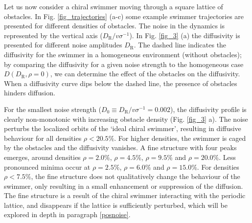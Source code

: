 \documentclass[aps,pre,twocolumn,showpacs,superscriptaddress,amsmath,amssymb,longbibliography]{revtex4-2}
\begin{document}
Let us now consider a chiral swimmer moving through a square lattice of obstacles. In Fig. \ref{fig_trajectories} (a-c) some example swimmer trajectories are presented for different densities of obstacles. The noise in the dynamics is represented by the vertical axis ($D_{\textrm{R}}/v\sigma^{-1}$). In Fig. \ref{fig_3} (a) the diffusivity is presented for different noise amplitudes $D_{\textrm{R}}$. The dashed line indicates the diffusivity for the swimmer in a homogeneous environment (without obstacles); by comparing the diffusivity for a given noise strength to the homogeneous case $D(D_{\textrm{R}},\rho=0)$, we can determine the effect of the obstacles on the diffusivity.  When a diffusivity curve dips below the dashed line, the presence of obstacles hinders diffusion.

For the smallest noise strength ($D_{\textrm{0}} \equiv D_{\textrm{R}}/v\sigma^{-1} =0.002$), the diffusivity profile is clearly non-monotonic with increasing obstacle density (Fig. \ref{fig_3} a). The noise perturbs the localized orbits of the `ideal chiral swimmer', resulting in diffusive behaviour for all densities $\rho < 20.5 \%$. For higher densities, the swimmer is caged by the obstacles and the diffusivity vanishes.  A fine structure with four peaks emerges, around densities $\rho = 2.0 \%$, $\rho = 4.5 \%$, $\rho = 9.5 \%$ and $\rho = 20.0 \%$. Less pronounced minima occur at $ \rho = 2.5 \% $, $\rho = 6.0 \%$ and $ \rho = 15.0\%$. For densities $\rho < 7.5\%$, the fine structure does not qualitatively change the behaviour of the swimmer, only resulting in a small enhancement or suppression of the diffusion. The fine structure is a result of the chiral swimmer interacting with the periodic lattice, and disappears if the lattice is sufficiently perturbed, which will be explored in depth in paragraph \ref{posnoise}.
\end{document}
